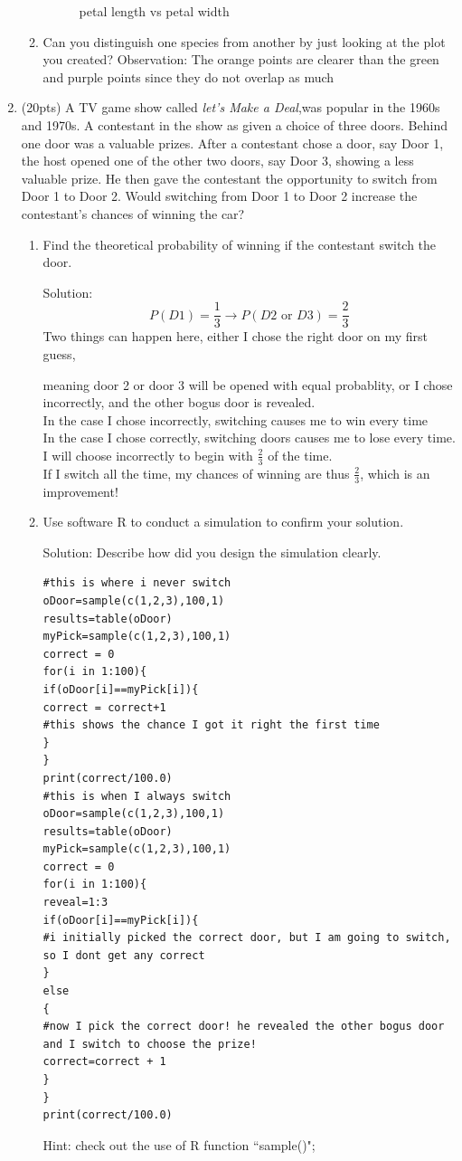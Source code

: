 \documentclass[11pt]{article}
\begin{document}
\begin{enumerate}
\begin{enumerate}
\begin{figure}[H]
	\caption[petal length vs petal width]{petal length vs petal width}
	\label{irisInfo}
\end{figure}
\item Can you distinguish one species from another by just looking at the plot you created?
Observation: The orange points are clearer than the green and purple points since they do not overlap as much
\end{enumerate}

\item (20pts) A TV game show called \emph{let's Make a Deal},was popular in the 1960s and 1970s. A contestant in the show as given a choice of three doors. Behind one door was a valuable prizes. After a contestant chose a door, say Door 1, the host opened one of the other two doors, say Door 3, showing a less valuable prize. He then gave the contestant the opportunity to switch from Door 1 to Door 2. Would switching from Door 1 to Door 2 increase the contestant's chances of winning the car?
\begin{enumerate}
\item Find the theoretical probability of winning if the contestant switch the door.\\
{\color{blue} Solution: 
	\[
		P(D1)=\frac{1}{3} \rightarrow P(D2\text{ or }D3)=\frac{2}{3}
	\]
	Two things can happen here, either I chose the right door on my first guess,

	 meaning door 2 or door 3 will be opened with equal probablity, or I chose incorrectly, and the other bogus door is revealed.\\
	 In the case I chose incorrectly, switching causes me to win every time \\
	 In the case I chose correctly, switching doors causes me to lose every time.\\
	 I will choose incorrectly to begin with $\frac{2}{3}$ of the time.\\
	 If I switch all the time, my chances of winning are thus $\frac{2}{3}$, which is an improvement! 
}
\item Use software R to conduct a simulation to confirm your solution.\\
{\color{blue} Solution: Describe how did you design the simulation clearly.
\begin{verbatim}
#this is where i never switch
oDoor=sample(c(1,2,3),100,1)
results=table(oDoor)
myPick=sample(c(1,2,3),100,1)
correct = 0
for(i in 1:100){
if(oDoor[i]==myPick[i]){
correct = correct+1
#this shows the chance I got it right the first time
}
}
print(correct/100.0)
#this is when I always switch
oDoor=sample(c(1,2,3),100,1)
results=table(oDoor)
myPick=sample(c(1,2,3),100,1)
correct = 0
for(i in 1:100){
reveal=1:3
if(oDoor[i]==myPick[i]){
#i initially picked the correct door, but I am going to switch, so I dont get any correct
}
else
{
#now I pick the correct door! he revealed the other bogus door and I switch to choose the prize!
correct=correct + 1
}
}
print(correct/100.0)
\end{verbatim}
}
Hint: check out the use of R function ``sample()";
\end{enumerate}
\end{enumerate}
\end{document}
